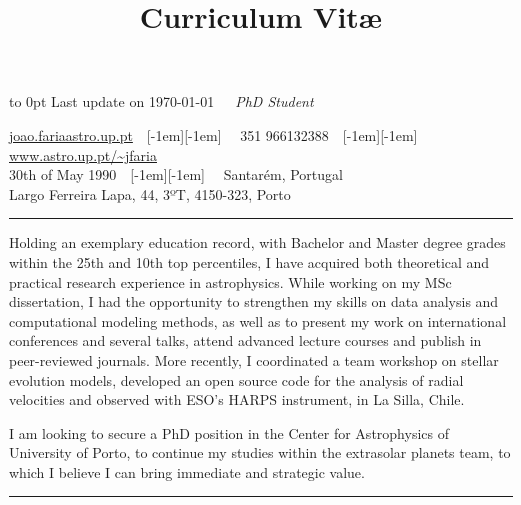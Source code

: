 \documentclass[10pt]{moderncv}
\title{Curriculum Vit\ae{}}
\newcommand\maintitle[3]{\vbox to 0pt{\hfill\scriptsize\color{gray} #3}\vspace{-0.4em}\noindent{\LARGE \textbf{#1}}\ \ \ \emph{#2}}
\newcommand{\breakvspace}[1]{\pagebreak[2]\vspace{#1}\pagebreak[2]}
\newcommand{\nobreakvspace}[1]{\nopagebreak[4]\vspace{#1}\nopagebreak[4]}
\newcommand{\spacedhrule}[2]{\breakvspace{#1}\hrule\nobreakvspace{#2}}
\newcommand*\bull{\raisebox{-0.365em}[-1em][-1em]{\textscale{4}{$\cdot$}}}
\newcommand*\sbull{\ \ \bull \ \ }
\begin{document}

\maintitle{Jo\~{a}o Pedro de Sousa Faria}{PhD Student}{Last update on \today}

\nobreakvspace{0.3em}  %

\noindent \href{mailto:joao.faria@astro.up.pt}{joao.faria\MVAt astro.up.pt}\sbull
\textsmaller{+}351 966132388\sbull
\href{http://www.astro.up.pt/\~jfaria}{www.astro.up.pt/\textasciitilde jfaria}
\\
30th of May 1990\sbull
Santarém, Portugal
\\
Largo Ferreira Lapa, 44, 3ºT, 4150-323, Porto



\spacedhrule{1.1em}{0.4em}  %
\vspace{-1em}  %
\begin{multicols}{2}  %
Holding an exemplary education record, 
with Bachelor and Master degree grades within the 25th and 10th top percentiles, 
I have acquired both theoretical and practical research experience in astrophysics.
While working on my MSc dissertation, 
I had the opportunity to strengthen my skills on data analysis and computational modeling methods,
as well as to present my work on international conferences and several talks, 
attend advanced lecture courses
and publish in peer-reviewed journals. 
More recently, I coordinated a team workshop on stellar evolution models, 
developed an open source code for the analysis of radial velocities 
and observed with ESO's HARPS instrument, in La Silla, Chile.

I am looking to secure a PhD position in the Center for Astrophysics of University of Porto, 
to continue my studies within the extrasolar planets team, to which I believe I can bring immediate and
strategic value.
\end{multicols}
\spacedhrule{0.4em}{0.4em}  %
\end{document}
